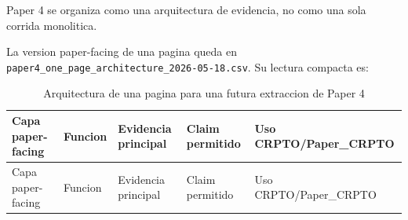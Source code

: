 \documentclass[
  spanish,
  11pt,
  letterpaper,
]{scrbook}
\theoremstyle{plain}
\theoremstyle{remark}
\begin{document}
Paper 4 se organiza como una arquitectura de evidencia, no como una sola
corrida monolitica.

La version paper-facing de una pagina queda en
\texttt{paper4\_one\_page\_architecture\_2026-05-18.csv}. Su lectura
compacta es:

\begin{longtable}[]{@{}
  >{\raggedright\arraybackslash}p{}
  >{\raggedright\arraybackslash}p{}
  >{\raggedright\arraybackslash}p{}
  >{\raggedright\arraybackslash}p{}
  >{\raggedright\arraybackslash}p{}@{}}
\caption{Arquitectura de una pagina para una futura extraccion de Paper
4}\label{tbl-paper4-one-page-architecture}\tabularnewline
\toprule\noalign{}
\begin{minipage}[b]{\linewidth}\raggedright
Capa paper-facing
\end{minipage} & \begin{minipage}[b]{\linewidth}\raggedright
Funcion
\end{minipage} & \begin{minipage}[b]{\linewidth}\raggedright
Evidencia principal
\end{minipage} & \begin{minipage}[b]{\linewidth}\raggedright
Claim permitido
\end{minipage} & \begin{minipage}[b]{\linewidth}\raggedright
Uso CRPTO/Paper\_CRPTO
\end{minipage} \\
\midrule\noalign{}
\endfirsthead
\toprule\noalign{}
\begin{minipage}[b]{\linewidth}\raggedright
Capa paper-facing
\end{minipage} & \begin{minipage}[b]{\linewidth}\raggedright
Funcion
\end{minipage} & \begin{minipage}[b]{\linewidth}\raggedright
Evidencia principal
\end{minipage} & \begin{minipage}[b]{\linewidth}\raggedright
Claim permitido
\end{minipage} & \begin{minipage}[b]{\linewidth}\raggedright
Uso CRPTO/Paper\_CRPTO
\end{minipage} \\

\end{longtable}
\end{document}
